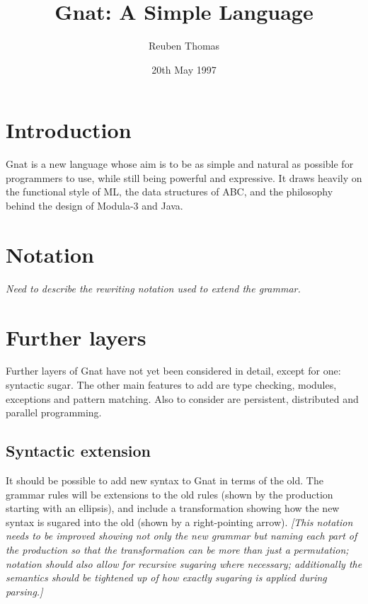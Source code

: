 \documentclass[english]{article}
\begin{document}
\title{Gnat: A Simple Language}
\author{Reuben Thomas}
\date{20th May 1997}
\maketitle



\section{Introduction}

Gnat is a new language whose aim is to be as simple and natural as possible for programmers to use, while still being powerful and expressive. It draws heavily on the functional style of ML, the data structures of ABC, and the philosophy behind the design of Modula-3 and Java.



\section{Notation}

\emph{Need to describe the rewriting notation used to extend the grammar.}



\section{Further layers}

Further layers of Gnat have not yet been considered in detail, except for one: syntactic sugar. The other main features to add are type checking, modules, exceptions and pattern matching. Also to consider are persistent, distributed and parallel programming.


\subsection{Syntactic extension}

It should be possible to add new syntax to Gnat in terms of the old. The grammar rules will be extensions to the old rules (shown by the production starting with an ellipsis), and include a transformation showing how the new syntax is sugared into the old (shown by a right-pointing arrow). \emph{[This notation needs to be improved showing not only the new grammar but naming each part of the production so that the transformation can be more than just a permutation; notation should also allow for recursive sugaring where necessary; additionally the semantics should be tightened up of how exactly sugaring is applied during parsing.]}
\end{document}
